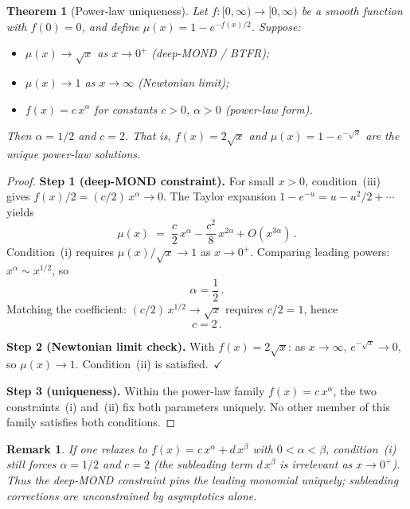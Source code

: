 \documentclass[prd,twocolumn,superscriptaddress,longbibliography,floatfix]{revtex4-2}
\newtheorem{theorem}{Theorem}
\newtheorem*{remark}{Remark}
\begin{document}
\begin{theorem}[Power-law uniqueness]
\label{thm:powerlaw}
Let $f\colon [0,\infty) \to [0,\infty)$ be a smooth function with
$f(0) = 0$, and define $\mu(x) = 1 - e^{-f(x)/2}$.
Suppose:
\begin{itemize}
  \item[\textup{(i)}] $\mu(x) \to \sqrt{x}$ as $x \to 0^{+}$
    \textup{(deep-MOND / BTFR)};
  \item[\textup{(ii)}] $\mu(x) \to 1$ as $x \to \infty$
    \textup{(Newtonian limit)};
  \item[\textup{(iii)}] $f(x) = c\,x^{\alpha}$ for constants $c > 0$,
    $\alpha > 0$ \textup{(power-law form)}.
\end{itemize}
Then $\alpha = 1/2$ and $c = 2$.  That is,
$f(x) = 2\sqrt{x}$ and $\mu(x) = 1 - e^{-\sqrt{x}}$ are the
\emph{unique} power-law solutions.
\end{theorem}

\begin{proof}
\textbf{Step 1 (deep-MOND constraint).}
For small $x > 0$, condition~(iii) gives
$f(x)/2 = (c/2)\,x^{\alpha} \to 0$.  The Taylor expansion
$1 - e^{-u} = u - u^2/2 + \cdots$ yields
\begin{equation}
  \mu(x) \;=\; \frac{c}{2}\,x^{\alpha}
    - \frac{c^2}{8}\,x^{2\alpha} + O(x^{3\alpha})\,.
  \label{eq:mu-expand}
\end{equation}
Condition~(i) requires $\mu(x)/\sqrt{x} \to 1$ as $x \to 0^{+}$.
Comparing leading powers: $x^{\alpha} \sim x^{1/2}$, so
\begin{equation}
  \alpha = \frac{1}{2}\,.
  \label{eq:alpha-half}
\end{equation}
Matching the coefficient: $(c/2)\,x^{1/2} \to \sqrt{x}$ requires
$c/2 = 1$, hence
\begin{equation}
  c = 2\,.
  \label{eq:c-two}
\end{equation}

\textbf{Step 2 (Newtonian limit check).}
With $f(x) = 2\sqrt{x}$: as $x \to \infty$,
$e^{-\sqrt{x}} \to 0$, so $\mu(x) \to 1$.
Condition~(ii) is satisfied.~$\checkmark$

\textbf{Step 3 (uniqueness).}
Within the power-law family $f(x) = c\,x^{\alpha}$, the two
constraints~(i) and~(ii) fix both parameters uniquely.
No other member of this family satisfies both conditions.
\end{proof}

\begin{remark}
If one relaxes to $f(x) = c\,x^{\alpha} + d\,x^{\beta}$ with
$0 < \alpha < \beta$, condition~(i) still forces $\alpha = 1/2$ and
$c = 2$ (the subleading term $d\,x^{\beta}$ is irrelevant as
$x \to 0^{+}$).
Thus the deep-MOND constraint pins the leading monomial uniquely;
subleading corrections are unconstrained by asymptotics alone.
\end{remark}
\end{document}
